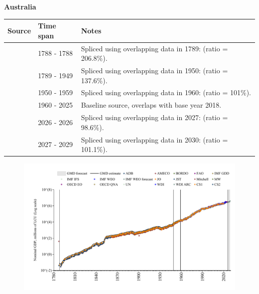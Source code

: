 \documentclass[12pt,a4paper,landscape]{article}
\begin{document}
\begin{adjustbox}{max totalsize={\paperwidth}{\paperheight},center}
\begin{minipage}[t][\textheight][t]{\textwidth}
\vspace*{0.5cm}
{}
\begin{center}
{\Large\bfseries Australia}
\end{center}
\vspace{0.5cm}
\begin{table}[H]
\centering
\small
\begin{tabular}{|l|l|l|}
\hline
\textbf{Source} & \textbf{Time span} & \textbf{Notes} \\
\hline
\rowcolor{white}\cite{CS2_AUS}& 1788 - 1788 &Spliced using overlapping data in 1789: (ratio = 206.8\%).\\
\rowcolor{lightgray}\cite{CS1_AUS}& 1789 - 1949 &Spliced using overlapping data in 1950: (ratio = 137.6\%).\\
\rowcolor{white}\cite{IMF_GDD}& 1950 - 1959 &Spliced using overlapping data in 1960: (ratio = 101\%).\\
\rowcolor{lightgray}\cite{OECD_EO}& 1960 - 2025 &Baseline source, overlaps with base year 2018.\\
\rowcolor{white}\cite{AMECO}& 2026 - 2026 &Spliced using overlapping data in 2027: (ratio = 98.6\%).\\
\rowcolor{lightgray}\cite{IMF_WEO_forecast}& 2027 - 2029 &Spliced using overlapping data in 2030: (ratio = 101.1\%).\\
\hline
\end{tabular}
\end{table}
\begin{figure}[H]
\centering
\includegraphics[width=\textwidth,height=0.6\textheight,keepaspectratio]{graphs/AUS_nGDP.pdf}
\end{figure}
\end{minipage}
\end{adjustbox}
\end{document}
